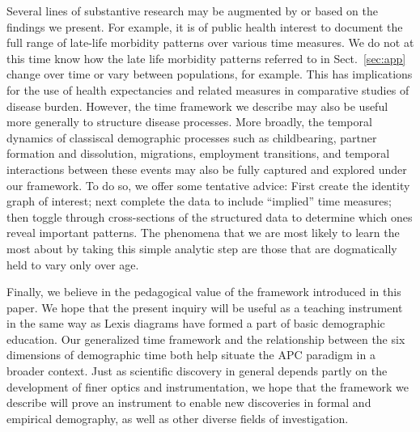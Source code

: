 \documentclass[12pt,oneside,a4paper]{article} %
\theoremstyle{definition}
\DeclareRobustCommand{\VAN}[3]{#2} %
\begin{document}
Several lines of substantive research may be augmented by or based on the
findings we present. For example, it is of public health interest to document
the full range of late-life morbidity patterns over various time measures. We do
not at this time know how the late life morbidity patterns referred to in
Sect.~\ref{sec:app} change over time or vary between populations, for example.
This has implications for the use of health expectancies and related measures in comparative studies of disease burden.
However, the time framework we describe may also be useful more generally to
structure disease processes. More broadly, the temporal dynamics of classiscal
demographic processes such as childbearing, partner formation and dissolution,
migrations, employment transitions, and temporal interactions between these events may also be fully captured and explored under our framework. To do so, we
offer some tentative advice: First create the identity graph of interest; next
complete the data to include ``implied'' time measures; then toggle through
cross-sections of the structured data to determine which ones reveal important patterns.
The phenomena that we are most likely to learn the most about by taking this
simple analytic step are those that are dogmatically held to vary only over age.

Finally, we believe in the pedagogical value of the framework
introduced in this paper. We hope that the
present inquiry will be useful as a teaching instrument in the same way as Lexis
diagrams have formed a part of basic demographic education.
Our generalized time framework and the relationship between the six dimensions
of demographic time both help situate the APC paradigm in a broader context.
Just as scientific discovery in general depends partly on the development of
finer optics and instrumentation, we hope that the framework we describe will prove an instrument to enable new discoveries in formal and empirical demography, as well as other diverse fields of
investigation.


  
\DeclareRobustCommand{\VAN}[3]{#3}
 
%
 
%  
\end{document}
